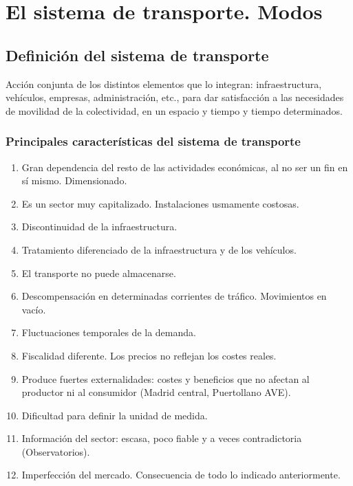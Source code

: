 \chapter{El sistema de transporte. Modos}
\section{Definición del sistema de transporte}
Acción conjunta de los distintos elementos que lo integran: infraestructura, vehículos, empresas, administración, etc., para dar satisfacción a las necesidades de movilidad de la colectividad, en un espacio y tiempo y tiempo determinados.

\subsection{Principales características del sistema de transporte}
\begin{enumerate}
    \item Gran dependencia del resto de las actividades económicas, al no ser un fin en sí mismo. Dimensionado.
    \item Es un sector muy capitalizado. Instalaciones usmamente costosas.
    \item Discontinuidad de la infraestructura.
    \item Tratamiento diferenciado de la infraestructura y de los vehículos.
    \item El transporte no puede almacenarse.
    \item Descompensación en determinadas corrientes de tráfico. Movimientos en vacío.
    \item Fluctuaciones temporales de la demanda.
    \item Fiscalidad diferente. Los precios no reflejan los costes reales.
    \item Produce fuertes externalidades: costes y beneficios que no afectan al productor ni al consumidor (Madrid central, Puertollano AVE).
    \item Dificultad para definir la unidad de medida.
    \item Información del sector: escasa, poco fiable y a veces contradictoria (Observatorios).
    \item Imperfección del mercado. Consecuencia de todo lo indicado anteriormente.
\end{enumerate}

